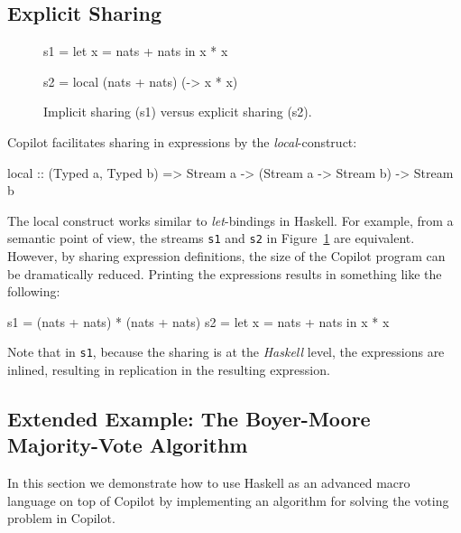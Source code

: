 \subsection{Explicit Sharing}
\label{sec:explicit_sharing}

\begin{figure}[ht]
\begin{minipage}{0.25\textwidth}
\begin{code}
s1 = let x = nats + nats
     in x * x
\end{code}
\end{minipage}%
\begin{minipage}{0.25\textwidth}
\begin{code}
s2 = local (nats + nats)
      (\x -> x * x)
\end{code}
\end{minipage}
\caption{Implicit sharing (s1) versus explicit sharing (s2).}
\label{fig:explicit_sharing}
\end{figure}

\noindent Copilot facilitates sharing in expressions by the \emph{local}-construct:
%
\begin{code}
local
  :: (Typed a, Typed b)
  => Stream a
  -> (Stream a -> Stream b)
  -> Stream b
\end{code}
%
The local construct works similar to \emph{let}-bindings in Haskell.  For
example, from a semantic point of view, the streams {\tt s1} and {\tt s2} in
Figure~\ref{fig:explicit_sharing} are equivalent.  However, by sharing
expression definitions, the size of the Copilot program can be dramatically
reduced.  Printing the expressions results in something like the following:
%
\begin{code}
s1 = (nats + nats) * (nats + nats)
s2 = let x = nats + nats in
     x * x
\end{code}
%
\noindent
Note that in {\tt s1}, because the sharing is at the \emph{Haskell} level, the
expressions are inlined, resulting in replication in the resulting expression.

\subsection{Extended Example: The Boyer-Moore Majority-Vote Algorithm}
\label{subsec:boyer_moore}

In this section we demonstrate how to use Haskell as an advanced macro language
on top of Copilot by implementing an algorithm for solving the voting problem
in Copilot.

